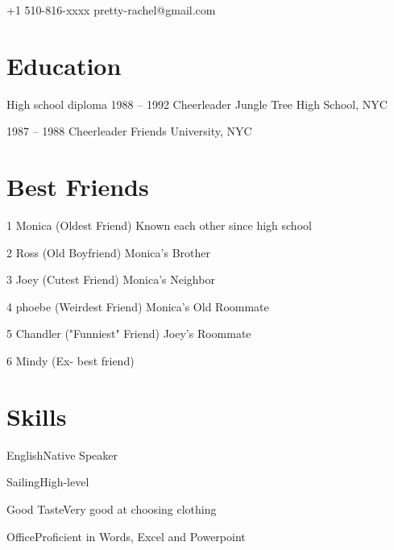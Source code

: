 \documentclass{tccv}
\begin{document}
    {+1 510-816-xxxx}
    {pretty-rachel@gmail.com}

\section{Education}

\begin{yearlist}

\item[High school diploma]{1988 -- 1992}
     {Cheerleader}
     {Jungle Tree High School, NYC}

\item{1987 -- 1988}
     {Cheerleader}
     {Friends University, NYC}

\end{yearlist}

\section{Best Friends}

\begin{yearlist}

\item{1}
     {Monica (Oldest Friend)}
     {Known each other since high school}

\item{2}
     {Ross (Old Boyfriend)}
     {Monica's Brother}

\item{3}
     {Joey (Cutest Friend)}
     {Monica's Neighbor}

\item{4}
     {phoebe (Weirdest Friend)}
     {Monica's Old Roommate}

\item{5}
     {Chandler ("Funniest" Friend)}
     {Joey's Roommate}
     
\item{6}
     {Mindy (Ex- best friend)}
     

\end{yearlist}

\section{Skills}

\begin{factlist}
\item{English}{Native Speaker}
\item{Sailing}{High-level}
\item{Good Taste}{Very good at choosing clothing}
\item{Office}{Proficient in Words, Excel and Powerpoint}
\end{factlist}
\end{document}
